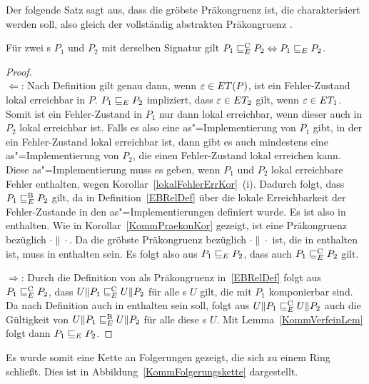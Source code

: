 Der folgende Satz sagt aus, dass \ERel{} die gröbste Präkongruenz ist, die
charakterisiert werden soll, also gleich der vollständig abstrakten
Präkongruenz \ECRel{}.

\begin{Satz}
  \label{KommVollAbstraktSatz}
  Für zwei \MEIO{}s $P_1$ und $P_2$ mit derselben Signatur gilt $P_1 \sqsubseteq  _E^\mathrm{C}
  P_2\Leftrightarrow P_1 \sqsubseteq  _E{} P_2$.
\end{Satz}
\begin{proof}\mbox{}\\
  \glqq$\Leftarrow$\grqq: Nach Definition gilt genau dann, wenn
  $\varepsilon\in ET (P)$, ist ein Fehler-Zustand lokal erreichbar in $P$. $P_1
   \sqsubseteq  _E P_2$ impliziert, dass $\varepsilon\in ET _2$ gilt, wenn
  $\varepsilon\in ET _1$. Somit ist ein Fehler-Zustand in $P_1$ nur dann lokal
  erreichbar, wenn dieser auch in $P_2$ lokal erreichbar ist. Falls es also
  eine as"=Implementierung von $P_1$ gibt, in der ein Fehler-Zustand lokal
  erreichbar ist, dann gibt es auch mindestens eine as"=Implementierung von
  $P_2$, die einen Fehler-Zustand lokal erreichen kann. Diese
  as"=Implementierung muss es geben, wenn $P_1$ und $P_2$ lokal erreichbare
  Fehler enthalten, wegen Korollar~\ref{lokalFehlerErrKor}~(i). Dadurch folgt,
  dass $P_1 \sqsubseteq  _E^\mathrm{B} P_2$ gilt, da \EBRel{} in Definition~\ref{EBRelDef} über die
  lokale Erreichbarkeit der Fehler-Zustande in den as"=Implementierungen
  definiert wurde. Es ist also \ERel{} in \EBRel{} enthalten. Wie in
  Korollar~\ref{KommPraekonKor} gezeigt, ist \ERel{} eine Präkongruenz
  bezüglich $\cdot\|\cdot$. Da \ECRel{} die gröbste Präkongruenz bezüglich
  $\cdot\|\cdot$ ist, die in \EBRel{} enthalten ist, muss \ERel{} in \ECRel{}
  enthalten sein. Es folgt also aus $P_1 \sqsubseteq  _E P_2$, dass auch $P_1 \sqsubseteq  _E^\mathrm{C} P_2$
  gilt.

  \glqq$\Rightarrow$\grqq: Durch die Definition von \ECRel{} als Präkongruenz
  in~\ref{EBRelDef} folgt aus $P_1 \sqsubseteq  _E^\mathrm{C}{} P_2$, dass $U\|P_1 \sqsubseteq  _E^\mathrm{C} U\|P_2$ für
  alle \MEIO{}s $U$ gilt, die mit $P_1$ komponierbar sind. Da \ECRel{} nach
  Definition auch in \EBRel{} enthalten sein soll, folgt aus $U\|P_1 \sqsubseteq  _E^\mathrm{C}{}
  U\|P_2$ auch die Gültigkeit von $U\|P_1 \sqsubseteq  _E^\mathrm{B}{}U\|P_2$ für alle diese
  \MEIO{}s $U$. Mit Lemma~\ref{KommVerfeinLem} folgt dann $P_1 \sqsubseteq  _E{} P_2$.
\end{proof}

Es wurde somit eine Kette an Folgerungen gezeigt, die sich zu einem Ring
schließt. Dies ist in Abbildung~\ref{KommFolgerungskette} dargestellt.

